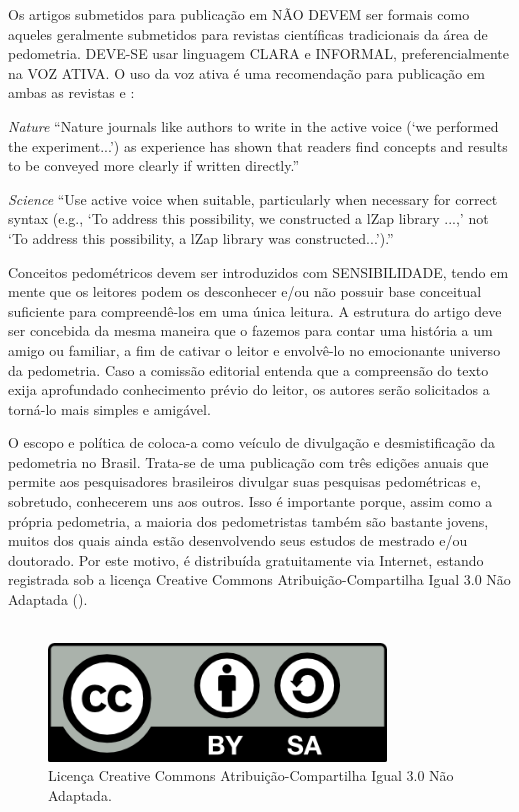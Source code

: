 Os artigos submetidos para publicação em \pedometria{} NÃO DEVEM ser formais como aqueles geralmente submetidos para revistas científicas tradicionais da área de pedometria. DEVE-SE usar linguagem CLARA e INFORMAL, preferencialmente na VOZ ATIVA. O uso da voz ativa é uma recomendação para publicação em ambas as revistas \Nature{} e \Science:

\begin{description}
 \item \textit{Nature} ``Nature journals like authors to write in the active voice (`we performed the experiment...') as experience has shown that readers find concepts and results to be conveyed more clearly if written directly.''
 \item \textit{Science} ``Use active voice when suitable, particularly when necessary for correct syntax (e.g., `To address this possibility, we constructed a lZap library ...,' not `To address this possibility, a lZap library was constructed...').''
\end{description}

Conceitos pedométricos devem ser introduzidos com SENSIBILIDADE, tendo em mente que os leitores podem os desconhecer e/ou não possuir base conceitual suficiente para compreendê-los em uma única leitura. A estrutura do artigo deve ser concebida da mesma maneira que o fazemos para contar uma história a um amigo ou familiar, a fim de cativar o leitor e envolvê-lo no emocionante universo da pedometria. Caso a comissão editorial entenda que a compreensão do texto exija aprofundado conhecimento prévio do leitor, os autores serão solicitados a torná-lo mais simples e amigável.

O escopo e política de \pedometria{} coloca-a como veículo de divulgação e desmistificação da pedometria no Brasil. Trata-se de uma publicação com três edições anuais que permite aos pesquisadores brasileiros divulgar suas pesquisas pedométricas e, sobretudo, conhecerem uns aos outros. Isso é importante porque, assim como a própria pedometria, a maioria dos pedometristas também são bastante jovens, muitos dos quais ainda estão desenvolvendo seus estudos de mestrado e/ou doutorado. Por este motivo, \pedometria{} é distribuída gratuitamente via Internet, estando registrada sob a licença Creative Commons Atribuição-Compartilha Igual 3.0 Não Adaptada (\CreativeCommons).\\
\\
\begin{figure}[h!]
 \centering
 \includegraphics[width=0.8\textwidth]{figuras/cc-by-sa}
 \caption{Licença Creative Commons Atribuição-Compartilha Igual 3.0 Não Adaptada.}
\end{figure}

